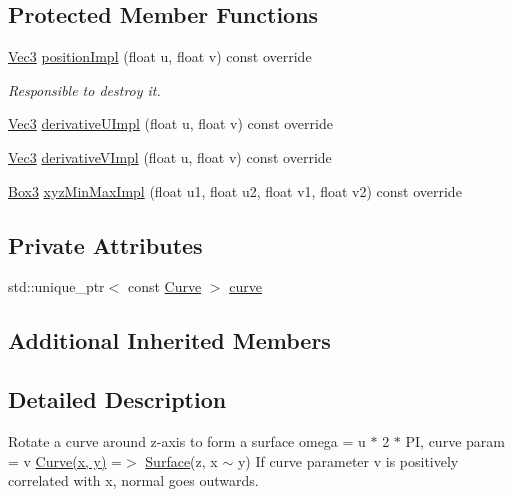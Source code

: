 \subsection*{Protected Member Functions}
\begin{DoxyCompactItemize}
\item 
\hyperlink{vec_8h_ae4fcaa7c0a3935930ed1be5f70b90373}{Vec3} \hyperlink{classAxisymmetric_a65f503a73188b0647945bf3a6a5b901e}{position\+Impl} (float u, float v) const override
\begin{DoxyCompactList}\small\item\em Responsible to destroy it. \end{DoxyCompactList}\item 
\hyperlink{vec_8h_ae4fcaa7c0a3935930ed1be5f70b90373}{Vec3} \hyperlink{classAxisymmetric_a2af551bce6cffc034a278de5c2f5f3c4}{derivative\+U\+Impl} (float u, float v) const override
\item 
\hyperlink{vec_8h_ae4fcaa7c0a3935930ed1be5f70b90373}{Vec3} \hyperlink{classAxisymmetric_ab62630c58ba420d44eb39753f27abba9}{derivative\+V\+Impl} (float u, float v) const override
\item 
\hyperlink{structBox3}{Box3} \hyperlink{classAxisymmetric_a2718336bc4e05234a3f57bbe80ec29d3}{xyz\+Min\+Max\+Impl} (float u1, float u2, float v1, float v2) const override
\end{DoxyCompactItemize}
\subsection*{Private Attributes}
\begin{DoxyCompactItemize}
\item 
std\+::unique\+\_\+ptr$<$ const \hyperlink{classCurve}{Curve} $>$ \hyperlink{classAxisymmetric_a9786b5a7bc06ecb80325baf1193a92cc}{curve}
\end{DoxyCompactItemize}
\subsection*{Additional Inherited Members}


\subsection{Detailed Description}
Rotate a curve around z-\/axis to form a surface omega = u $\ast$ 2 $\ast$ PI, curve param = v \hyperlink{classCurve}{Curve(x, y)} =$>$ \hyperlink{classSurface}{Surface}(z, x $\sim$ y) If curve parameter v is positively correlated with x, normal goes outwards. 

